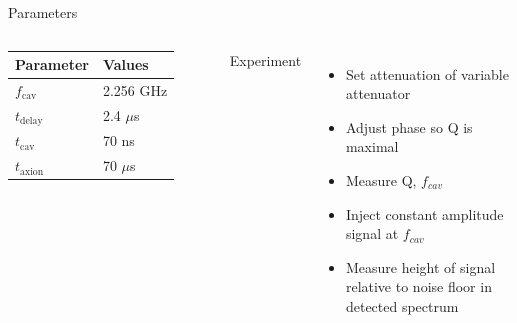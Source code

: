 \documentclass{beamer}
\begin{document}
\begin{frame}{Parameters}
\begin{columns}
\begin{tabular}{| l l |}
\hline
Parameter & Values \\
\hline
\hline
$f_{\text{cav}}$ & 2.256 GHz \\ 
$t_{\text{delay}}$ & 2.4 $\mu$s \\
$t_{\text{cav}}$ & 70 ns \\ 
$t_{\text{axion}}$ & 70 $\mu$s \\
\hline
\end{tabular}
Experiment
\begin{itemize}
\item Set attenuation of variable attenuator
\item Adjust phase so Q is maximal
\item Measure Q, $f_{cav}$
\item Inject constant amplitude signal at $f_{cav}$
\item Measure height of signal relative to noise floor in detected spectrum
\end{itemize}
\end{columns}
\end{frame}

%
%
%


%

\end{document}
